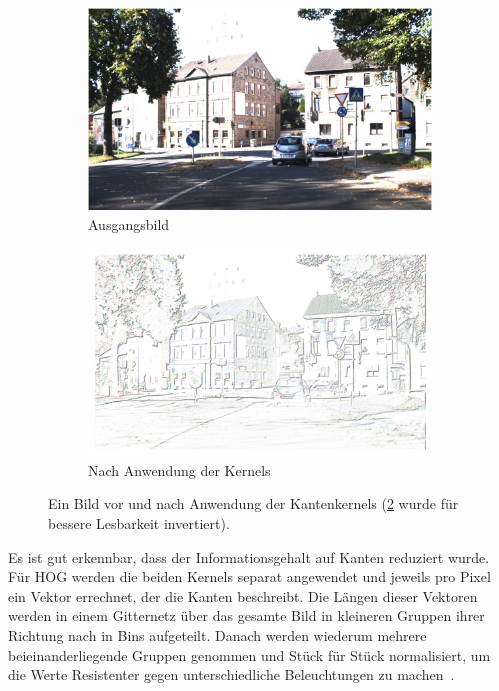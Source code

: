 \documentclass[runningheads]{llncs}
\begin{document}
\begin{figure}[H]
    \centering
    \begin{subfigure}{0.49\textwidth}
        \centering
        \includegraphics[width=\linewidth]{images/00001.jpg}
        \caption{Ausgangsbild}
        \label{fig3original}
    \end{subfigure}
    \hfill
    \begin{subfigure}{0.49\textwidth}
        \centering
        \includegraphics[width=\linewidth]{images/edges_inverted.png}
        \caption{Nach Anwendung der Kernels}
        \label{fig3edges}
    \end{subfigure}
    \caption{Ein Bild vor und nach Anwendung der Kantenkernels (\ref{fig3edges} wurde für bessere Lesbarkeit invertiert).}
    \label{fig3}
\end{figure}

Es ist gut erkennbar, dass der Informationsgehalt auf Kanten reduziert wurde. Für HOG werden die beiden Kernels separat angewendet und jeweils pro Pixel ein Vektor errechnet, der die Kanten beschreibt. Die Längen dieser Vektoren werden in einem Gitternetz über das gesamte Bild in kleineren Gruppen ihrer Richtung nach in Bins aufgeteilt. Danach werden wiederum mehrere beieinanderliegende Gruppen genommen und Stück für Stück normalisiert, um die Werte Resistenter gegen unterschiedliche Beleuchtungen zu machen~\cite{ref_opencv_hog}.
\end{document}
